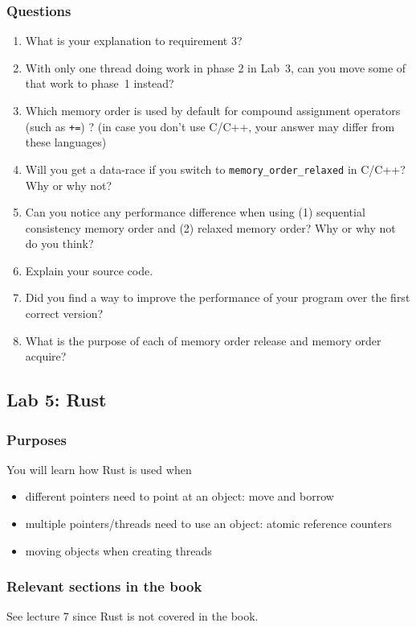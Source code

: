 \documentclass{forsete}
\begin{document}
\subsubsection*{Questions}
\begin{enumerate}
\item What is your explanation to requirement 3?
\item With only one thread doing work in phase 2 in Lab~3, can you move some of that work to phase~1 instead?
\item Which memory order is used by default for compound assignment operators (such as \verb.+=.) ?  (in case you don't use C/C++, your answer may differ from these languages)
\item Will you get a data-race if you switch to \verb.memory_order_relaxed. in C/C++? Why or why not?
\item Can you notice any performance difference when using (1) sequential consistency memory order
and (2) relaxed memory order? Why or why not do you think?
\item Explain your source code.
\item Did you find a way to improve the performance of your program over the first correct version?
\item What is the purpose of each of memory order release and memory order acquire?

\end{enumerate}

\newpage
\subsection*{Lab 5: Rust}
\subsubsection*{Purposes}
You will learn how Rust is used when
\begin{itemize}
\item different pointers need to point at an object: move and borrow
\item multiple pointers/threads need to use an object: atomic reference counters
\item moving objects when creating threads
\end{itemize}

\subsubsection*{Relevant sections in the book}
See lecture 7 since Rust is not covered in the book.
\end{document}
